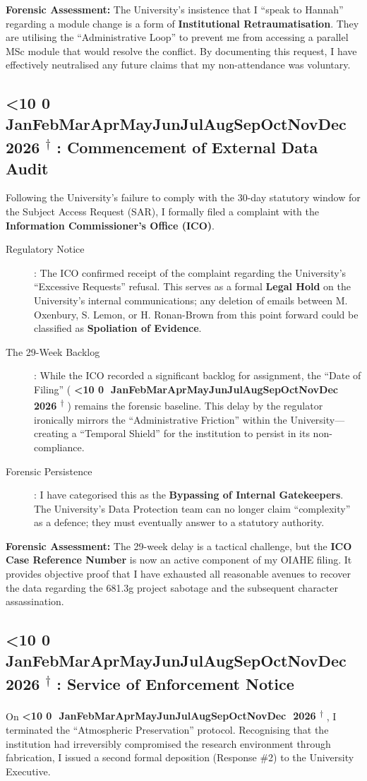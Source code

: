 \documentclass{EMBASSY}
\DeclareRobustCommand{\gmt}[3]{%
    \texorpdfstring{%
        {\color{DateGold}\textbf{%
            \ifnum#1<10 0\fi#1\,\textperiodcentered\,%
            \ifcase#2\or Jan\or Feb\or Mar\or Apr\or May\or Jun\or Jul\or Aug\or Sep\or Oct\or Nov\or Dec\fi
            \,\textperiodcentered\,20#3%
            \textsuperscript{$\dagger$}%
        }}%
    }{%
        (#1/#2/#3)%
    }%
}
\begin{document}
\noindent\textbf{Forensic Assessment:} The University's insistence that I ``speak to Hannah'' regarding a module change is a form of \textbf{Institutional Retraumatisation}. They are utilising the ``Administrative Loop'' to prevent me from accessing a parallel MSc module that would resolve the conflict. By documenting this request, I have effectively neutralised any future claims that my non-attendance was voluntary.

\subsection{\gmt{18}{1}{26}: Commencement of External Data Audit}
Following the University's failure to comply with the 30-day statutory window for the Subject Access Request (SAR), I formally filed a complaint with the \textbf{Information Commissioner's Office (ICO)}.

\begin{description}
	\item[Regulatory Notice]: The ICO confirmed receipt of the complaint regarding the University’s ``Excessive Requests'' refusal. This serves as a formal \textbf{Legal Hold} on the University's internal communications; any deletion of emails between M. Oxenbury, S. Lemon, or H. Ronan-Brown from this point forward could be classified as \textbf{Spoliation of Evidence}.
	\item[The 29-Week Backlog]: While the ICO recorded a significant backlog for assignment, the ``Date of Filing'' (\gmt{18}{1}{26}) remains the forensic baseline. This delay by the regulator ironically mirrors the ``Administrative Friction'' within the University---creating a ``Temporal Shield'' for the institution to persist in its non-compliance.
	\item[Forensic Persistence]: I have categorised this as the \textbf{Bypassing of Internal Gatekeepers}. The University’s Data Protection team can no longer claim ``complexity'' as a defence; they must eventually answer to a statutory authority.
\end{description}

\noindent\textbf{Forensic Assessment:} The 29-week delay is a tactical challenge, but the \textbf{ICO Case Reference Number} is now an active component of my OIAHE filing. It provides objective proof that I have exhausted all reasonable avenues to recover the data regarding the 681.3g project sabotage and the subsequent character assassination.

\subsection{\gmt{19}{1}{26}: Service of Enforcement Notice}
On \gmt{19}{1}{26}, I terminated the ``Atmospheric Preservation'' protocol. Recognising that the institution had irreversibly compromised the research environment through fabrication, I issued a second formal deposition (Response \#2) to the University Executive.
\end{document}
